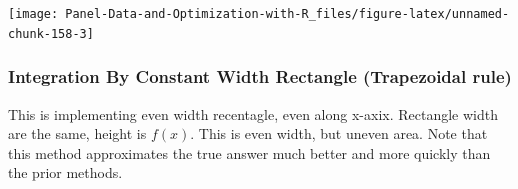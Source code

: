 \documentclass[
]{book}
\begin{document}
\begin{center}\texttt{[image: Panel-Data-and-Optimization-with-R\_files/figure-latex/unnamed-chunk-158-3]} \end{center}

\hypertarget{integration-by-constant-width-rectangle-trapezoidal-rule}{%
\subsubsection{Integration By Constant Width Rectangle (Trapezoidal rule)}\label{integration-by-constant-width-rectangle-trapezoidal-rule}}

This is implementing even width recentagle, even along x-axix. Rectangle width are the same, height is \(f(x)\). This is even width, but uneven area. Note that this method approximates the true answer much better and more quickly than the prior methods.
\end{document}
